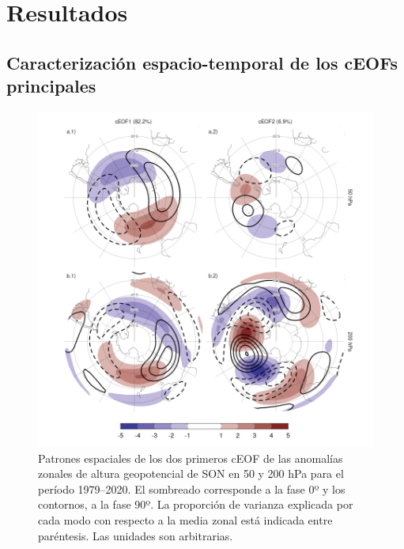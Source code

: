 \documentclass[12pt,oneside,a4paper]{reedthesis}
\begin{document}
\hypertarget{resultados-1}{%
\section{Resultados}\label{resultados-1}}

\hypertarget{caracterizaciuxf3n-espacio-temporal-de-los-ceofs-principales}{%
\subsection{Caracterización espacio-temporal de los cEOFs principales}\label{caracterizaciuxf3n-espacio-temporal-de-los-ceofs-principales}}



\begin{figure}

{\centering \includegraphics{figures/20-ceofs/ceofs-1-1} 

}

\caption{Patrones espaciales de los dos primeros cEOF de las anomalías zonales de altura geopotencial de SON en 50 y 200 hPa para el período 1979--2020. El sombreado corresponde a la fase 0º y los contornos, a la fase 90º. La proporción de varianza explicada por cada modo con respecto a la media zonal está indicada entre paréntesis. Las unidades son arbitrarias.}\label{fig:ceofs-1}
\end{figure}
\end{document}
